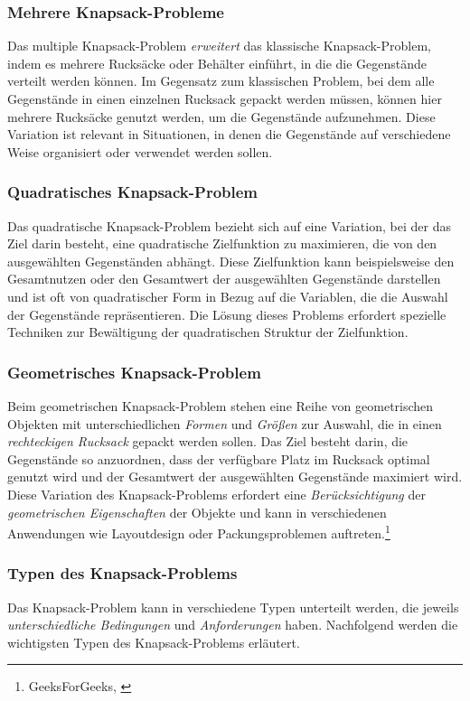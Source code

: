 \subsubsection*{Mehrere Knapsack-Probleme}
Das multiple Knapsack-Problem \textit{erweitert} das klassische Knapsack-Problem, indem es mehrere Rucksäcke oder Behälter
einführt, in die die Gegenstände verteilt werden können. Im Gegensatz zum klassischen Problem, bei dem alle Gegenstände in
einen einzelnen Rucksack gepackt werden müssen, können hier mehrere Rucksäcke genutzt werden, um die Gegenstände aufzunehmen.
Diese Variation ist relevant in Situationen, in denen die Gegenstände auf verschiedene Weise organisiert oder verwendet
werden sollen.

\subsubsection*{Quadratisches Knapsack-Problem}
Das quadratische Knapsack-Problem bezieht sich auf eine Variation, bei der das Ziel darin besteht, eine quadratische
Zielfunktion zu maximieren, die von den ausgewählten Gegenständen abhängt. Diese Zielfunktion kann beispielsweise den
Gesamtnutzen oder den Gesamtwert der ausgewählten Gegenstände darstellen und ist oft von quadratischer Form in Bezug auf
die Variablen, die die Auswahl der Gegenstände repräsentieren. Die Lösung dieses Problems erfordert spezielle Techniken
zur Bewältigung der quadratischen Struktur der Zielfunktion.

\subsubsection*{Geometrisches Knapsack-Problem}
Beim geometrischen Knapsack-Problem stehen eine Reihe von geometrischen Objekten mit unterschiedlichen \textit{Formen}
und \textit{Größen} zur Auswahl, die in einen \textit{rechteckigen Rucksack} gepackt werden sollen. Das Ziel besteht darin,
die Gegenstände so anzuordnen, dass der verfügbare Platz im Rucksack optimal genutzt wird und der Gesamtwert der
ausgewählten Gegenstände maximiert wird. Diese Variation des Knapsack-Problems erfordert eine \textit{Berücksichtigung}
der \textit{geometrischen Eigenschaften} der Objekte und kann in verschiedenen Anwendungen wie Layoutdesign oder Packungsproblemen
auftreten.\footnote{GeeksForGeeks, \cite{Introduction to Knapsack Problem, its Types and How to solve them}}

\subsubsection{Typen des Knapsack-Problems}
Das Knapsack-Problem kann in verschiedene Typen unterteilt werden, die jeweils \textit{unterschiedliche Bedingungen} und
\textit{Anforderungen} haben. Nachfolgend werden die wichtigsten Typen des Knapsack-Problems erläutert.

